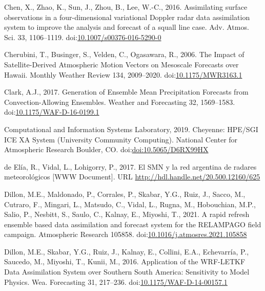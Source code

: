 \documentclass[authoryear,preprint,review,12pt]{elsarticle} %
\begin{document}
\leavevmode\hypertarget{ref-chen2016}{}%
Chen, X., Zhao, K., Sun, J., Zhou, B., Lee, W.-C., 2016. Assimilating surface observations in a four-dimensional variational Doppler radar data assimilation system to improve the analysis and forecast of a squall line case. Adv. Atmos. Sci. 33, 1106--1119. doi:\href{https://doi.org/10.1007/s00376-016-5290-0}{10.1007/s00376-016-5290-0}

\leavevmode\hypertarget{ref-cherubini2006}{}%
Cherubini, T., Businger, S., Velden, C., Ogasawara, R., 2006. The Impact of Satellite-Derived Atmospheric Motion Vectors on Mesoscale Forecasts over Hawaii. Monthly Weather Review 134, 2009--2020. doi:\href{https://doi.org/10.1175/MWR3163.1}{10.1175/MWR3163.1}

\leavevmode\hypertarget{ref-clark2017}{}%
Clark, A.J., 2017. Generation of Ensemble Mean Precipitation Forecasts from Convection-Allowing Ensembles. Weather and Forecasting 32, 1569--1583. doi:\href{https://doi.org/10.1175/WAF-D-16-0199.1}{10.1175/WAF-D-16-0199.1}

\leavevmode\hypertarget{ref-Cheyenne2019}{}%
Computational and Information Systems Laboratory, 2019. Cheyenne: HPE/SGI ICE XA System (University Community Computing). National Center for Atmospheric Research Boulder, CO. doi:\href{https://doi.org/doi:10.5065/D6RX99HX}{doi:10.5065/D6RX99HX}

\leavevmode\hypertarget{ref-deelia2017}{}%
de Elía, R., Vidal, L., Lohigorry, P., 2017. El SMN y la red argentina de radares meteorológicos {[}WWW Document{]}. URL \url{http://hdl.handle.net/20.500.12160/625}

\leavevmode\hypertarget{ref-dillon2021}{}%
Dillon, M.E., Maldonado, P., Corrales, P., Skabar, Y.G., Ruiz, J., Sacco, M., Cutraro, F., Mingari, L., Matsudo, C., Vidal, L., Rugna, M., Hobouchian, M.P., Salio, P., Nesbitt, S., Saulo, C., Kalnay, E., Miyoshi, T., 2021. A rapid refresh ensemble based data assimilation and forecast system for the RELAMPAGO field campaign. Atmospheric Research 105858. doi:\href{https://doi.org/10.1016/j.atmosres.2021.105858}{10.1016/j.atmosres.2021.105858}

\leavevmode\hypertarget{ref-dillon2016}{}%
Dillon, M.E., Skabar, Y.G., Ruiz, J., Kalnay, E., Collini, E.A., Echevarría, P., Saucedo, M., Miyoshi, T., Kunii, M., 2016. Application of the WRF-LETKF Data Assimilation System over Southern South America: Sensitivity to Model Physics. Wea. Forecasting 31, 217--236. doi:\href{https://doi.org/10.1175/WAF-D-14-00157.1}{10.1175/WAF-D-14-00157.1}
\end{document}
